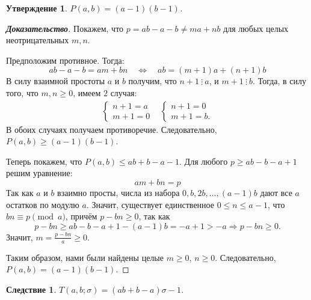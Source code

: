 \documentclass[12pt]{article}
\newtheorem{proposition}[theorem]{Утверждение}
\newtheorem{corollary}[theorem]{Следствие}
\begin{document}
\begin{proposition}
$P(a, b) = (a - 1)(b - 1)$.
\end{proposition}
\begin{proof}[\textbf{Доказательство}]
Покажем, что $p = ab - a - b \ne ma + nb$ для любых целых неотрицательных $m, n$.

Предположим противное. Тогда: \begin{equation*}
 ab - a - b = am + bn \quad \Longleftrightarrow \quad ab = (m + 1)a + (n + 1) b
\end{equation*}
В силу взаимной простоты $a$ и $b$ получим, что $n + 1 \ \vdots \ a$, и $m + 1 \ \vdots \ b$. Тогда, в силу того, что $m, n \ge 0$, имеем $2$ случая:\begin{align*}
     \begin{cases}
        n + 1 = a\\
        m + 1 = 0
    \end{cases}
    &
    \begin{cases}
        n + 1 = 0\\
        m + 1 = b.
    \end{cases}
\end{align*}
В обоих случаях получаем противоречие. Следовательно, $P(a, b) \ge (a - 1)(b - 1)$.

Теперь покажем, что $P(a, b) \le ab + b - a - 1$. Для любого $p \ge ab - b - a + 1$ решим уравнение: \begin{equation*}
am + bn = p
\end{equation*}
Так как $a$ и $b$ взаимно просты, числа из набора $0, b, 2b, \dots, (a - 1)b$ дают все $a$ остатков по модулю $a$. Значит, существует единственное $0 \le n \le a - 1$, что $bn \equiv p \pmod a$, причём $p - bn \ge 0$, так как 
\begin{equation*}
p - bn \ge ab - b - a + 1 - (a - 1)b = -a + 1 > -a \Longrightarrow p - bn \ge 0.
\end{equation*}
Значит, $m = \frac{p - bn}{a} \ge 0$.

Таким образом, нами были найдены целые $m \ge 0$, $n \ge 0$. Следовательно, $P(a, b) = (a - 1)(b - 1)$.
\end{proof}
\begin{corollary}
$T(a, b; \sigma) = (ab + b - a)\sigma - 1$.
\end{corollary}
\end{document}
